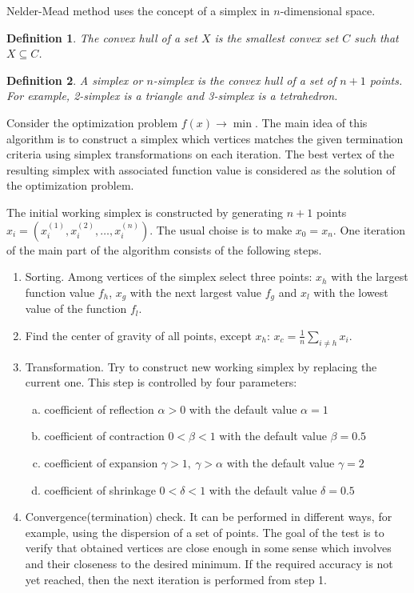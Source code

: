 \documentclass[%
master,         %
subf,           %
href,           %
colorlinks=true %
]{disser}
\numberwithin{equation}{section}
\numberwithin{figure}{section}
\newtheorem{definition}{Definition}[section]
\begin{document}
Nelder-Mead method uses the concept of a simplex in $n$-dimensional space. 

\begin{definition}
The convex hull of a set $X$ is the smallest convex set $C$ such that $X \subseteq C$.
\end{definition}
\begin{definition}
A simplex or $n$-simplex is the convex hull of a set of $n+1$ points. For example, 2-simplex is a triangle and 3-simplex is a tetrahedron.
\end{definition}

Consider the optimization problem $f(x) \to \min$. The main idea of this algorithm is to construct a simplex which vertices matches the given termination criteria using simplex transformations on each iteration. The best vertex of the resulting simplex with associated function value is considered as the solution of the optimization problem.

The initial working simplex is constructed by generating $n+1$ points $x_i = \left(x^{(1)}_i,x^{(2)}_i,\ldots,x^{(n)}_i\right)$. The usual choise is to make $x_0 = x_n$. One iteration of the main part of the algorithm consists of the following steps.

\begin{enumerate}
\item Sorting. Among vertices of the simplex select three points: $x_h$ with the largest function value $f_h$, $x_g$ with the next largest value $f_g$ and $x_l$ with the lowest value of the function $f_l$. 
\item Find the center of gravity of all points, except $x_h$: $x_c=\frac{1}{n} \sum_{i\neq h} x_i$.
\item Transformation. Try to construct new working simplex by replacing the current one. This step is controlled by four parameters: 
\begin{enumerate}[a)]
	\item coefficient of reflection $\alpha > 0$ with the default value $\alpha = 1$
	\item coefficient of contraction $0 < \beta < 1$ with the default value $\beta = 0.5$
	\item coefficient of expansion $\gamma > 1,\ \gamma > \alpha$ with the default value $\gamma = 2$
\item coefficient of shrinkage $0 < \delta < 1$ with the default value $\delta = 0.5$
\end{enumerate}
\item Convergence(termination) check. It can be performed in different ways, for example, using the dispersion of a set of points. The goal of the test is to verify that obtained vertices are close enough in some sense which involves and their closeness to the desired minimum. If the required accuracy is not yet reached, then the next iteration is performed from step 1.
\end{enumerate}
\end{document}
